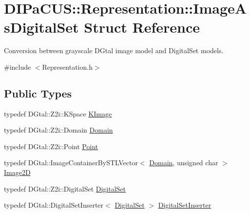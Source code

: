 \hypertarget{structDIPaCUS_1_1Representation_1_1ImageAsDigitalSet}{}\section{D\+I\+Pa\+C\+US\+:\+:Representation\+:\+:Image\+As\+Digital\+Set Struct Reference}
\label{structDIPaCUS_1_1Representation_1_1ImageAsDigitalSet}


Conversion between grayscale D\+Gtal image model and Digital\+Set models.  




{\ttfamily \#include $<$Representation.\+h$>$}

\subsection*{Public Types}
\begin{DoxyCompactItemize}
\item 
typedef D\+Gtal\+::\+Z2i\+::\+K\+Space \mbox{\hyperlink{structDIPaCUS_1_1Representation_1_1ImageAsDigitalSet_afa81bc0256169e31c499fa6e44f9f5bb}{K\+Image}}
\item 
typedef D\+Gtal\+::\+Z2i\+::\+Domain \mbox{\hyperlink{structDIPaCUS_1_1Representation_1_1ImageAsDigitalSet_acc30a7e7d3f45b546be17ca4d2961e0e}{Domain}}
\item 
typedef D\+Gtal\+::\+Z2i\+::\+Point \mbox{\hyperlink{structDIPaCUS_1_1Representation_1_1ImageAsDigitalSet_a16ad0b192ebf99b4d55bade91a62c847}{Point}}
\item 
typedef D\+Gtal\+::\+Image\+Container\+By\+S\+T\+L\+Vector$<$ \mbox{\hyperlink{structDIPaCUS_1_1Representation_1_1ImageAsDigitalSet_acc30a7e7d3f45b546be17ca4d2961e0e}{Domain}}, unsigned char $>$ \mbox{\hyperlink{structDIPaCUS_1_1Representation_1_1ImageAsDigitalSet_a594777514834a88dac93cac43b5e9324}{Image2D}}
\item 
typedef D\+Gtal\+::\+Z2i\+::\+Digital\+Set \mbox{\hyperlink{structDIPaCUS_1_1Representation_1_1ImageAsDigitalSet_a3a19b478392377afed24a5234dfdbd68}{Digital\+Set}}
\item 
typedef D\+Gtal\+::\+Digital\+Set\+Inserter$<$ \mbox{\hyperlink{structDIPaCUS_1_1Representation_1_1ImageAsDigitalSet_a3a19b478392377afed24a5234dfdbd68}{Digital\+Set}} $>$ \mbox{\hyperlink{structDIPaCUS_1_1Representation_1_1ImageAsDigitalSet_a81f59f774fe5b44575a6ffdf29e60ee8}{Digital\+Set\+Inserter}}
\end{DoxyCompactItemize}
